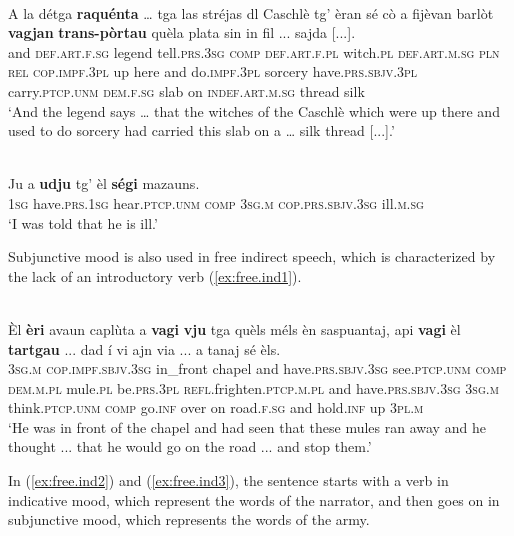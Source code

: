 \ea
\label{ex:subj3}
\\
\gll    A la détga \textbf{raquénta} … tga las stréjas dl Caschlè tg’ èran sé cò a fijèvan barlòt \textbf{vagjan} \textbf{trans-pòrtau} quèla plata sin\footnotemark{} in fil ... sajda [...].\\
and \textsc{def.art.f.sg} legend tell.\textsc{prs.3sg} {} \textsc{comp} \textsc{def.art.f.pl} witch.\textsc{pl} \textsc{def.art.m.sg} \textsc{pln} \textsc{rel} \textsc{cop.impf.3pl} up here and do.\textsc{impf.3pl} sorcery have.\textsc{prs.sbjv.3pl} carry.\textsc{ptcp.unm} \textsc{dem.f.sg} slab on \textsc{indef.art.m.sg} thread {} silk\\
\glt `And the legend says … that the witches of the Caschlè which were up there and used to do sorcery had carried this slab on a … silk thread [...].'
\z

\ea
\label{ex:subj4}
\\
\gll Ju a \textbf{udju} tg' èl \textbf{ségi} mazauns.\\
\textsc{1sg} have.\textsc{prs.1sg} hear.\textsc{ptcp.unm} \textsc{comp} \textsc{3sg.m} \textsc{cop.prs.sbjv.3sg} ill.\textsc{m.sg}\\
\glt `I was told that he is ill.'
\z

Subjunctive mood is also used in free indirect speech, which is characterized by the lack of an introductory verb (\ref{ex:free.ind1}).

\ea
\label{ex:free.ind1}
\\
\gll  Èl \textbf{èri} avaun caplùta a \textbf{vagi} \textbf{vju} tga quèls méls èn saspuantaj, api \textbf{vagi} èl \textbf{tartgau} ... dad í vi ajn via ... a tanaj sé èls.  \\
\textsc{3sg.m} \textsc{cop.impf.sbjv.3sg} in\_front chapel and have.\textsc{prs.sbjv.3sg} see.\textsc{ptcp.unm} \textsc{comp} \textsc{dem.m.pl} mule.\textsc{pl} be.\textsc{prs.3pl} \textsc{refl.}frighten.\textsc{ptcp.m.pl} and have.\textsc{prs.sbjv.3sg} \textsc{3sg.m} think.\textsc{ptcp.unm} {} \textsc{comp} go.\textsc{inf} over on road.\textsc{f.sg} {} and hold.\textsc{inf} up \textsc{3pl.m}\\
\glt `He was in front of the chapel and had seen that these mules ran away and he thought ... that he would go on the road ... and stop them.'
\z

In (\ref{ex:free.ind2}) and (\ref{ex:free.ind3}), the sentence starts with a verb in indicative mood, which represent the words of the narrator, and then goes on in subjunctive mood, which represents the words of the army.

